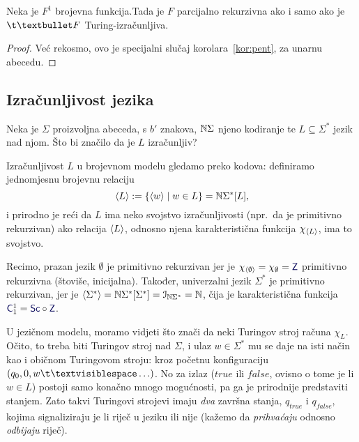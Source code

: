 \begin{korolar}[{name=[unarno reprezentirane brojevne funkcije u različitim modelima]}]\label{kor:peuf}
Neka je $F^1$\! brojevna funkcija.\newline Tada je $F$ parcijalno rekurzivna ako i samo ako je $\t\textbullet F$ Turing-izračunljiva.
\end{korolar}
\begin{proof}
Već rekosmo, ovo je specijalni slučaj korolara~\ref{kor:pent}, za unarnu abecedu.
\end{proof}

\subsection{Izračunljivost jezika}\label{sec:Todl}

Neka je $\Sigma$ proizvoljna abeceda, s $b'$ znakova, ${\mathbb N}\Sigma$ njeno kodiranje te $L\subseteq\Sigma^*$ jezik nad njom. Što bi značilo da je $L$ izračunljiv?

Izračunljivost $L$ u brojevnom modelu gledamo preko kodova: definiramo jednomjesnu brojevnu relaciju
\begin{equation}\label{eq:kodLdef}
    \langle L\rangle:=\{\langle w\rangle\mid w\in L\}={\mathbb N}\Sigma^*[L]\text,
\end{equation}
i prirodno je reći da $L$ ima neko svojstvo izračunljivosti (npr.\ da je primitivno rekurzivan) ako relacija $\langle L\rangle$, odnosno njena karakteristična funkcija $\chi_{\langle L\rangle}$, ima to svojstvo.

Recimo, prazan jezik $\emptyset$ je primitivno rekurzivan jer je $\chi_{\kr\emptyset}=\chi_\emptyset=\f Z$ primitivno rekurzivna (štoviše, inicijalna). Također, univerzalni jezik $\Sigma^*$ je primitivno rekurzivan, jer je $\langle\Sigma^*\rangle={\mathbb N}\Sigma^*[\Sigma^*]=\mathcal I_{{\mathbb N}\Sigma^*}={\mathbb N}$, čija je karakteristična funkcija $\f C_1^1=\f{Sc}\circ\f Z$.

U jezičnom modelu, moramo vidjeti što znači da neki Turingov stroj računa $\chi_L$. Očito, to treba biti Turingov stroj nad $\Sigma$, i ulaz $w\in\Sigma^*$ mu se daje na isti način kao i običnom Turingovom stroju: kroz početnu konfiguraciju $(q_0,0,w\bl\ldots)$. No za izlaz ($\mathit{true}$ ili $\mathit{false}$, ovisno o tome je li $w\in L$) postoji samo konačno mnogo mogućnosti, pa ga je prirodnije predstaviti stanjem. Zato takvi Turingovi strojevi imaju \emph{dva} završna stanja, $q_{\mathit{true}}$ i $q_{\mathit{false}}$, kojima signaliziraju je li riječ u jeziku ili nije (kažemo da \emph{prihvaćaju} odnosno \emph{odbijaju} riječ).

